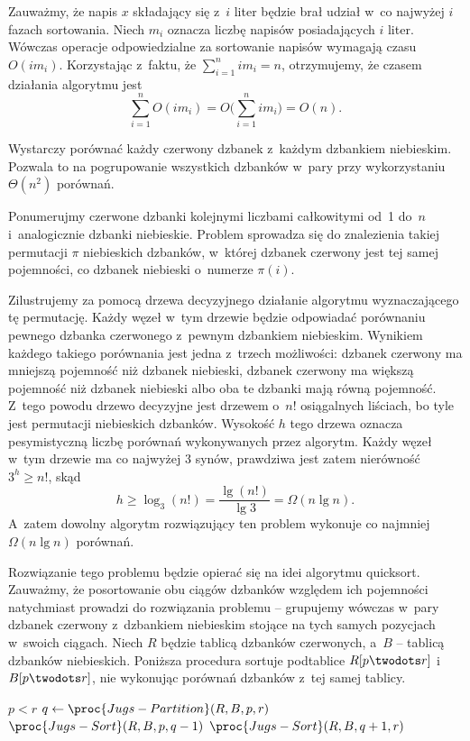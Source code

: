 Zauważmy, że napis $x$ składający się z~$i$ liter będzie brał udział w~co najwyżej $i$ fazach sortowania. Niech $m_i$ oznacza liczbę napisów posiadających $i$ liter. Wówczas operacje odpowiedzialne za sortowanie napisów  wymagają czasu $O(im_i)$. Korzystając z~faktu, że $\sum_{i=1}^nim_i=n$, otrzymujemy, że czasem działania algorytmu jest
\[
    \sum_{i=1}^nO(im_i) = O\biggl(\sum_{i=1}^nim_i\biggr) = O(n).
\]


\subproblem %
Wystarczy porównać każdy czerwony dzbanek z~każdym dzbankiem niebieskim. Pozwala to na pogrupowanie wszystkich dzbanków w~pary przy wykorzystaniu $\Theta(n^2)$ porównań.

\subproblem %
Ponumerujmy czerwone dzbanki kolejnymi liczbami całkowitymi od~1 do~$n$ i~analogicznie dzbanki niebieskie. Problem sprowadza się do znalezienia takiej permutacji $\pi$ niebieskich dzbanków, w~której  dzbanek czerwony jest tej samej pojemności, co dzbanek niebieski o~numerze $\pi(i)$.

Zilustrujemy za pomocą drzewa decyzyjnego działanie algorytmu wyznaczającego tę permutację. Każdy węzeł w~tym drzewie będzie odpowiadać porównaniu pewnego dzbanka czerwonego z~pewnym dzbankiem niebieskim. Wynikiem każdego takiego porównania jest jedna z~trzech możliwości: dzbanek czerwony ma mniejszą pojemność niż dzbanek niebieski, dzbanek czerwony ma większą pojemność niż dzbanek niebieski albo oba te dzbanki mają równą pojemność. Z~tego powodu drzewo decyzyjne jest drzewem  o~$n!$ osiągalnych liściach, bo tyle jest permutacji niebieskich dzbanków. Wysokość $h$ tego drzewa oznacza pesymistyczną liczbę porównań wykonywanych przez algorytm. Każdy węzeł w~tym drzewie ma co najwyżej 3 synów, prawdziwa jest zatem nierówność $3^h\ge n!$, skąd
\[
	h \ge \log_3(n!) = \frac{\lg(n!)}{\lg3} = \Omega(n\lg n).
\]
A~zatem dowolny algorytm rozwiązujący ten problem wykonuje co najmniej $\Omega(n\lg n)$ porównań.

\subproblem %
Rozwiązanie tego problemu będzie opierać się na idei algorytmu quicksort. Zauważmy, że posortowanie obu ciągów dzbanków względem ich pojemności natychmiast prowadzi do rozwiązania problemu -- grupujemy wówczas w~pary dzbanek czerwony z~dzbankiem niebieskim stojące na tych samych pozycjach w~swoich ciągach. Niech $R$ będzie tablicą dzbanków czerwonych, a~$B$ -- tablicą dzbanków niebieskich. Poniższa procedura sortuje podtablice $R[p\twodots r]$ i~$B[p\twodots r]$, nie wykonując porównań dzbanków z~tej samej tablicy.
\begin{codebox}
\li	\If $p<r$
\li		\Then
			$q\gets\proc{Jugs-Partition}(R,B,p,r)$
\li			$\proc{Jugs-Sort}(R,B,p,q-1)$
\li			$\proc{Jugs-Sort}(R,B,q+1,r)$
		\End
\end{codebox}

